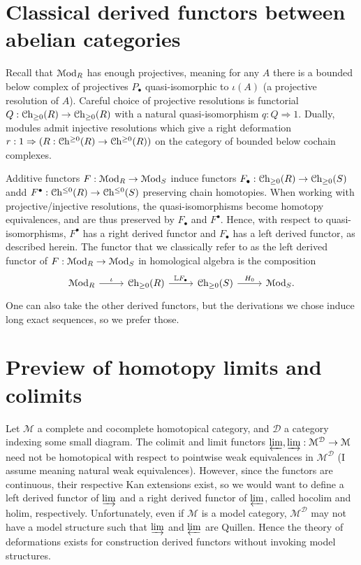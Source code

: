 \section{Classical derived functors between abelian categories}

Recall that $\mathcal{M}\mathrm{od}_R$ has enough projectives, meaning for any $A$ there is a bounded below complex of projectives $P_{\bullet} $ quasi-isomorphic to $\iota(A)$ (a projective resolution of $A$). Careful choice of projective resolutions is functorial $Q : \mathcal{C}\mathrm{h}_{\geq 0} (R) \to \mathcal{C}\mathrm{h}_{\geq 0} (R)$ with a natural quasi-isomorphism $q : Q \Rightarrow 1$. Dually, modules admit injective resolutions which give a right deformation $r : 1 \Rightarrow (R : \mathcal{C}\mathrm{h}^{\geq 0} (R) \to \mathcal{C}\mathrm{h}^{\geq 0} (R))$ on the category of bounded below cochain complexes.

Additive functors $F : \mathcal{M}\mathrm{od}_R \to \mathcal{M}\mathrm{od}_S$ induce functors $F_{\bullet} : \mathcal{C}\mathrm{h}_{\geq 0} (R) \to \mathcal{C}\mathrm{h}_{\geq 0} (S)$ andd $F^{\bullet} : \mathcal{C}\mathrm{h}^{\leq 0} (R) \to \mathcal{C}\mathrm{h}^{\leq 0} (S)$ preserving chain homotopies. When working with projective/injective resolutions, the quasi-isomorphisms become homotopy equivalences, and are thus preserved by $F_{\bullet} $ and $F^{\bullet} $. Hence, with respect to quasi-isomorphisms, $F^{\bullet} $ has a right derived functor and $F_{\bullet} $ has a left derived functor, as described herein. The functor that we classically refer to as the left derived functor of $F : \mathcal{M}\mathrm{od}_R \to \mathcal{M}\mathrm{od}_S$ in homological algebra is the composition
\[\begin{tikzcd}[row sep = 2.5em, column sep = 2.5em]
\Rmod_R \ar[" \iota ", r]  & \Ch_{\geq 0} (R)\ar[" \mathbb{L} F_{\bullet}  ", r]  & \Ch_{\geq 0} (S)\ar[" H_0 ", r]  & \Rmod_S.
\end{tikzcd}\]
One can also take the other derived functors, but the derivations we chose induce long exact sequences, so we prefer those.

\section{Preview of homotopy limits and colimits}

Let $\mathcal{M} $ a complete and cocomplete homotopical category, and $\mathcal{D} $ a category indexing some small diagram. The colimit and limit functors $\varprojlim ,\varinjlim : \mathcal{M} ^{\mathcal{D} }  \to \mathcal{M} $ need not be homotopical with respect to pointwise weak equivalences in $\mathcal{M} ^{\mathcal{D} } $ (I assume meaning natural weak equivalences). However, since the functors are continuous, their respective Kan extensions exist, so we would want to define a left derived functor of $\varinjlim $ and a right derived functor of $\varprojlim $, called hocolim and holim, respectively. Unfortunately, even if $\mathcal{M} $ is a model category, $\mathcal{M} ^{\mathcal{D} } $ may not have a model structure such that $\varinjlim $ and $\varprojlim $ are Quillen. Hence the theory of deformations exists for construction derived functors without invoking model structures.

